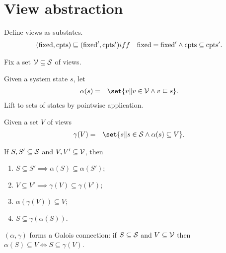 
\section{View abstraction}

Define views as substates.
\begin{eqnarray*}
(\fixed, \cpt ) \sqle (\fixed', \cpt') & iff & 
  \fixed = \fixed' \land \cpt \subseteq \cpt' .
\end{eqnarray*}


Fix a set $\V \subseteq \S$ of views.

Given a system state $s$, let
%
\begin{eqnarray*}
\alpha(s) & = &
  \set{ v \| v \in \V \land v \sqle s}.
\end{eqnarray*}
%
Lift to sets of states by pointwise application. 

Given a set $V$ of views
\begin{eqnarray*}
\gamma(V) & = &   \set{ s \| s \in \S \land \alpha(s) \subseteq V }.
\end{eqnarray*}



\begin{lemma}
If $S, S' \subseteq \S$ and $V, V' \subseteq \V$, then
\begin{enumerate}
\item $S \subseteq S' \implies \alpha(S) \subseteq \alpha(S')$;

\item $V \subseteq V' \implies \gamma(V) \subseteq \gamma(V')$;

\item $\alpha(\gamma(V)) \subseteq V$;

\item $S \subseteq \gamma(\alpha(S))$.
\end{enumerate}
\end{lemma}
%



\begin{lemma}
$(\alpha, \gamma)$ forms a Galois connection: if $S \subseteq \S$ and $V
  \subseteq \V$ then $\alpha(S) \subseteq V \iff S \subseteq \gamma(V)$.
\end{lemma}
%

